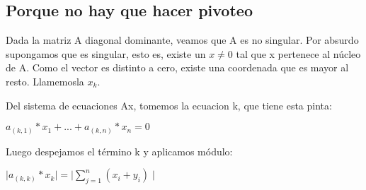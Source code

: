 \subsection{Porque no hay que hacer pivoteo}




Dada la matriz A diagonal dominante, veamos que A es no singular.
Por absurdo supongamos que es singular, esto es, existe un $x\neq 0$ tal que x pertenece al núcleo de A.
Como el vector es distinto a cero, existe una coordenada que es mayor al resto. Llamemosla $x_{k}$.


Del sistema de ecuaciones Ax, tomemos la ecuacion k, que tiene esta pinta:

$ a_{(k, 1)} * x_{1} + ... + a_{(k, n)} * x_{n} = 0 $

Luego despejamos el término k y aplicamos módulo:




 $ \mid a_{(k, k)} * x_{k} \mid = \mid \sum_{j=1}^{n} (x_{i}+y_{i}) \mid $
